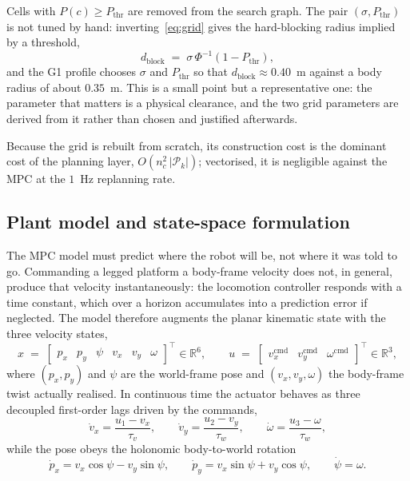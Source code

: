 \documentclass[11pt,a4paper]{article}
\newcommand{\R}{\mathbb{R}}
\begin{document}
Cells with $P(c)\ge P_{\mathrm{thr}}$ are removed from the search graph. The pair $(\sigma,P_{\mathrm{thr}})$
is not tuned by hand: inverting~\eqref{eq:grid} gives the hard-blocking radius implied by a threshold,
\begin{equation}
  d_{\mathrm{block}} \;=\; \sigma\,\Phi^{-1}\!\left(1-P_{\mathrm{thr}}\right),
  \label{eq:dblock}
\end{equation}
and the G1 profile chooses $\sigma$ and $P_{\mathrm{thr}}$ so that $d_{\mathrm{block}}\approx0.40$~m against
a body radius of about $0.35$~m. This is a small point but a representative one: the parameter that matters
is a physical clearance, and the two grid parameters are derived from it rather than chosen and justified
afterwards.

Because the grid is rebuilt from scratch, its construction cost is the dominant cost of the planning layer,
$O(n_c^2\,|\mathcal{P}_k|)$; vectorised, it is negligible against the MPC at the $1$~Hz replanning rate.

\subsection{Plant model and state-space formulation}
\label{sec:model}

The MPC model must predict where the robot will be, not where it was told to go. Commanding a legged platform
a body-frame velocity does not, in general, produce that velocity instantaneously: the locomotion controller
responds with a time constant, which over a horizon accumulates into a prediction error if neglected. The
model therefore augments the planar kinematic state with the three velocity states,
\begin{equation}
  x \;=\; \begin{bmatrix} p_x & p_y & \psi & v_x & v_y & \omega\end{bmatrix}^{\!\top}\in\R^{6},
  \qquad
  u \;=\; \begin{bmatrix} v_x^{\mathrm{cmd}} & v_y^{\mathrm{cmd}} & \omega^{\mathrm{cmd}}\end{bmatrix}^{\!\top}\in\R^{3},
  \label{eq:state}
\end{equation}
where $(p_x,p_y)$ and $\psi$ are the world-frame pose and $(v_x,v_y,\omega)$ the body-frame twist actually
realised. In continuous time the actuator behaves as three decoupled first-order lags driven by the commands,
\begin{equation}
  \dot v_x = \frac{u_1-v_x}{\tau_v},\qquad
  \dot v_y = \frac{u_2-v_y}{\tau_w},\qquad
  \dot \omega = \frac{u_3-\omega}{\tau_w},
  \label{eq:lagcont}
\end{equation}
while the pose obeys the holonomic body-to-world rotation
\begin{equation}
  \dot p_x = v_x\cos\psi - v_y\sin\psi,\qquad
  \dot p_y = v_x\sin\psi + v_y\cos\psi,\qquad
  \dot\psi = \omega .
  \label{eq:kincont}
\end{equation}
\end{document}
